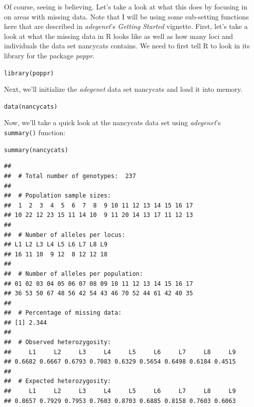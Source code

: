 \documentclass[letterpaper]{article}\usepackage[]{graphicx}\usepackage[]{color}
\makeatletter
\newcommand{\hlstd}[1]{\textcolor[rgb]{0,0,0}{#1}}%
\newcommand{\hlkwd}[1]{\textcolor[rgb]{0,0.267,0.4}{#1}}%
\newenvironment{kframe}{%
 \def\at@end@of@kframe{}%
 \ifinner\ifhmode%
  \def\at@end@of@kframe{\end{minipage}}%
  \begin{minipage}{\columnwidth}%
 \fi\fi%
 \def\FrameCommand##1{\hskip\@totalleftmargin \hskip-\fboxsep
 \colorbox{shadecolor}{##1}\hskip-\fboxsep
     \hskip-\linewidth \hskip-\@totalleftmargin \hskip\columnwidth}%
 \MakeFramed {\advance\hsize-\width
   \@totalleftmargin\z@ \linewidth\hsize
   \@setminipage}}%
 {\par\unskip\endMakeFramed%
 \at@end@of@kframe}
\newenvironment{knitrout}{}{} %
\newcommand{\poppr}{\textit{poppr}}
\newcommand{\adegenet}{\textit{adegenet}}
\makeatother
\begin{document}
Of course, seeing is believing. Let's take a look at what this does by focusing in on areas with missing data. Note that I will be using some sub-setting functions here that are described in \adegenet{}'s \textit{Getting Started} vignette. First, let's take a look at what the missing data in R looks like as well as how many loci and individuals the data set nancycats contains. We need to first tell R to look in its library for the package \poppr{}.
\begin{knitrout}\footnotesize
{}\color{fgcolor}\begin{kframe}
\begin{alltt}
\hlkwd{library}\hlstd{(poppr)}
\end{alltt}
\end{kframe}
\end{knitrout}

Next, we'll initialize the \adegenet{} data set nancycats and load it into memory.
\begin{knitrout}\footnotesize
{}\color{fgcolor}\begin{kframe}
\begin{alltt}
\hlkwd{data}\hlstd{(nancycats)}
\end{alltt}
\end{kframe}
\end{knitrout}

Now, we'll take a quick look at the nancycats data set using \adegenet{}'s \texttt{summary()}  function:
\begin{knitrout}\footnotesize
{}\color{fgcolor}\begin{kframe}
\begin{alltt}
\hlkwd{summary}\hlstd{(nancycats)}
\end{alltt}
\begin{verbatim}
## 
##  # Total number of genotypes:  237 
## 
##  # Population sample sizes:  
##  1  2  3  4  5  6  7  8  9 10 11 12 13 14 15 16 17 
## 10 22 12 23 15 11 14 10  9 11 20 14 13 17 11 12 13 
## 
##  # Number of alleles per locus:  
## L1 L2 L3 L4 L5 L6 L7 L8 L9 
## 16 11 10  9 12  8 12 12 18 
## 
##  # Number of alleles per population:  
## 01 02 03 04 05 06 07 08 09 10 11 12 13 14 15 16 17 
## 36 53 50 67 48 56 42 54 43 46 70 52 44 61 42 40 35 
## 
##  # Percentage of missing data:  
## [1] 2.344
## 
##  # Observed heterozygosity:  
##     L1     L2     L3     L4     L5     L6     L7     L8     L9 
## 0.6682 0.6667 0.6793 0.7083 0.6329 0.5654 0.6498 0.6184 0.4515 
## 
##  # Expected heterozygosity:  
##     L1     L2     L3     L4     L5     L6     L7     L8     L9 
## 0.8657 0.7929 0.7953 0.7603 0.8703 0.6885 0.8158 0.7603 0.6063
\end{verbatim}
\end{kframe}
\end{knitrout}
\end{document}
